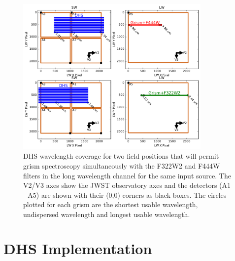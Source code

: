 \documentclass[iop]{emulateapj}
\begin{document}
\begin{figure}[!t]
\centering
\includegraphics[width=0.85\textwidth]{grism_pos_for_max_wcoverage.pdf}
\caption{DHS wavelength coverage for two field positions that will permit grism spectroscopy simultaneously with the F322W2 and F444W filters in the long wavelength channel for the same input source. The V2/V3 axes show the JWST observatory axes and the detectors (A1 - A5) are shown with their (0,0) corners as black boxes. The circles plotted for each grism are the shortest usable wavelength, undispersed wavelength and longest usable wavelength.}\label{fig:DHSwaveWGrism}
\end{figure}


\section{DHS Implementation}\label{sec:implementation}
\end{document}
